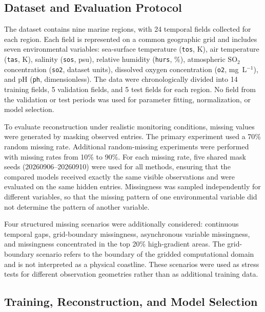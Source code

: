 \documentclass[conference]{IEEEtran}
\begin{document}
\subsection{Dataset and Evaluation Protocol}

The dataset contains nine marine regions, with 24 temporal fields collected for
each region. Each field is represented on a common geographic grid and includes
seven environmental variables: sea-surface temperature (\texttt{tos}, K), air
temperature (\texttt{tas}, K), salinity (\texttt{sos}, psu), relative humidity
(\texttt{hurs}, \%), atmospheric $\mathrm{SO_2}$ concentration (\texttt{so2},
dataset units), dissolved oxygen concentration (\texttt{o2}, mg~L$^{-1}$),
and pH (\texttt{ph}, dimensionless). The data
were chronologically divided into 14 training fields, 5 validation fields, and
5 test fields for each region. No field from the validation or test periods was
used for parameter fitting, normalization, or model selection.

To evaluate reconstruction under realistic monitoring conditions, missing
values were generated by masking observed entries. The primary experiment used
a 70\% random missing rate. Additional random-missing experiments were
performed with missing rates from 10\% to 90\%. For each missing rate, five
shared mask seeds (20260906--20260910) were used for all methods, ensuring that
the compared models received exactly the same visible observations and were
evaluated on the same hidden entries. Missingness was sampled independently
for different variables, so that the missing pattern of one environmental
variable did not determine the pattern of another variable.

Four structured missing scenarios were additionally considered: continuous
temporal gaps, grid-boundary missingness, asynchronous variable missingness, and
missingness concentrated in the top 20\% high-gradient areas. The grid-boundary
scenario refers to the boundary of the gridded computational domain and is not
interpreted as a physical coastline. These scenarios were used as stress tests
for different observation geometries rather than as additional training data.

\subsection{Training, Reconstruction, and Model Selection}
\end{document}
